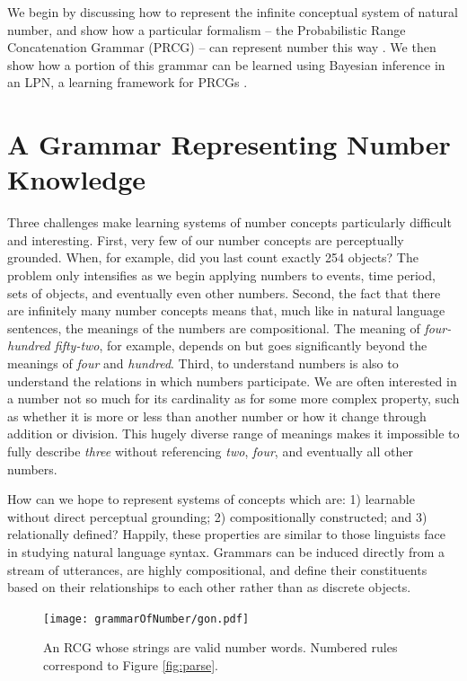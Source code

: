 \documentclass[10pt,letterpaper]{article}
\begin{document}
We begin by discussing how to represent the infinite conceptual system
of natural number, and show how a particular formalism -- the
Probabilistic Range Concatenation Grammar (PRCG) -- can represent
number this way \citep{boullier2005range}. We then show how a portion
of this grammar can be learned using Bayesian inference in an LPN, a
learning framework for PRCGs \citep{DecRulTen2015}.

\section{A Grammar Representing Number Knowledge}

Three challenges make learning systems of number concepts particularly
difficult and interesting. First, very few of our number concepts are
perceptually grounded. When, for example, did you last count exactly
254 objects? The problem only intensifies as we begin applying numbers
to events, time period, sets of objects, and eventually even other
numbers. Second, the fact that there are infinitely many number
concepts means that, much like in natural language sentences, the
meanings of the numbers are compositional. The meaning of
\emph{four-hundred fifty-two}, for example, depends on but goes
significantly beyond the meanings of \emph{four} and \emph{hundred}.
Third, to understand numbers is also to understand the relations in
which numbers participate. We are often interested in a number not so
much for its cardinality as for some more complex property, such as
whether it is more or less than another number or how it change
through addition or division. This hugely diverse range of meanings
makes it impossible to fully describe \emph{three} without referencing
\emph{two}, \emph{four}, and eventually all other numbers.

How can we hope to represent systems of concepts which are: 1)
learnable without direct perceptual grounding; 2) compositionally
constructed; and 3) relationally defined? Happily, these properties
are similar to those linguists face in studying natural language
syntax. Grammars can be induced directly from a stream of utterances,
are highly compositional, and define their constituents based on their
relationships to each other rather than as discrete objects.

\begin{figure}[t]
  \begin{centering}
    \texttt{[image: grammarOfNumber/gon.pdf]}
    \caption{An RCG whose strings are valid number words. Numbered rules correspond to Figure \ref{fig:parse}.}
    \label{fig:gon}
  \end{centering}
\end{figure}
\end{document}
